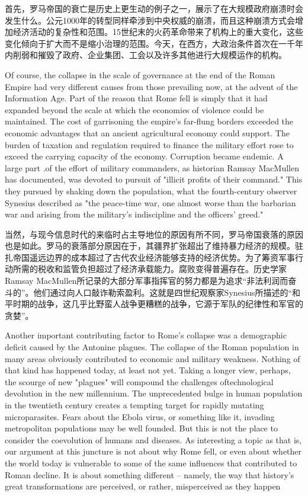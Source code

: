 \begin{Parallel}{97mm}{72mm}
  \ParallelRText
  {首先，罗马帝国的衰亡是历史上更生动的例子之一，展示了在大规模政府崩溃时会发生什么。公元1000年的转型同样牵涉到中央权威的崩溃，而且这种崩溃方式会增加经济活动的复杂性和范围。15世纪末的火药革命带来了机构上的重大变化，这些变化倾向于扩大而不是缩小治理的范围。今天，在西方，大政治条件首次在一千年内削弱和摧毁了政府、企业集团、工会以及许多其他进行大规模运作的机构。}
  \ParallelPar



  \ParallelLText
  {Of course, the collapse in the scale of governance at the end of the Roman Empire had very different causes from those prevailing now, at the advent of the Information Age. Part of the reason that Rome fell is simply that it had expanded beyond the scale at which the economies of violence could be maintained. The cost of garrisoning the empire's far-flung borders exceeded the economic advantages that an ancient agricultural economy could support. The burden of taxation and regulation required to finance the military effort rose to exceed the carrying capacity of the economy. Corruption became endemic. A large part .of the effort of military commanders, as historian Ramsay MacMullen has documented, was devoted to pursuit of "illicit profits of their command." This they pursued by shaking down the population, what the fourth-century observer Synesius described as "the peace-time war, one almost worse than the barbarian war and arising from the military's indiscipline and the officers' greed." }
  
  \ParallelRText
  {当然，与现今信息时代的来临时占主导地位的原因有所不同，罗马帝国衰落的原因也是如此。罗马的衰落部分原因在于，其疆界扩张超出了维持暴力经济的规模。驻扎帝国遥远边界的成本超过了古代农业经济能够支持的经济优势。为了筹资军事行动所需的税收和监管负担超过了经济承载能力。腐败变得普遍存在。历史学家Ramsay MacMullen所记录的大部分军事指挥官的努力都是为追求“非法利润而奋斗的”。他们通过向人口敲诈勒索盈利。这就是四世纪观察家Synesius所描述的“和平时期的战争，这几乎比野蛮人战争更糟糕的战争，它源于军队的纪律性和军官的贪婪”。}
  \ParallelPar



  \ParallelLText
  {Another important contributing factor to Rome's collapse was a demographic deficit caused by the Antonine plagues. The collapse of the Roman population in many areas obviously contributed to economic and military weakness. Nothing of that kind has happened today, at least not yet. Taking a longer view, perhaps, the scourge of new "plagues" will compound the challenges oftechnological devolution in the new millennium. The unprecedented bulge in human population in the twentieth century creates a tempting target for rapidly mutating microparasites. Fears about the Ebola virus, or something like it, invading metropolitan populations may be well founded. But this is not the place to consider the coevolution of humans and diseases. As interesting a topic as that is, our argument at this juncture is not about why Rome fell, or even about whether the world today is vulnerable to some of the same influences that contributed to Roman decline. It is about something different -- namely, the way that history's great transformations are perceived, or rather, misperceived as they happen}
  

\end{Parallel}
